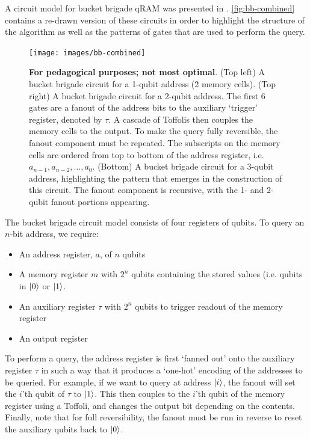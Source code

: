 \documentclass[a4paper,12pt]{article}
\begin{document}
A circuit model for bucket brigade qRAM was presented in \cite{Arunachalam2015}.
\autoref{fig:bb-combined} contains a re-drawn version of these circuits in order to highlight the structure of the algorithm as well as the patterns of gates that are used to perform the query.

\begin{figure}
 \centering
  \captionsetup{width=.89\linewidth}
 \texttt{[image: images/bb-combined]}
 \caption{\textbf{For pedagogical purposes; not most optimal}. 
 (Top left) A bucket brigade circuit for a 1-qubit address (2 memory cells). 
 (Top right) A bucket brigade circuit for a 2-qubit address. 
 The first 6 gates are a fanout of the address bits to the auxiliary `trigger' register, denoted by $\tau$. 
 A cascade of Toffolis then couples the memory cells to the output. 
 To make the query fully reversible, the fanout component must be repeated. 
 The subscripts on the memory cells are ordered from top to bottom of the address register, i.e. $a_{n-1}, a_{n-2}, \ldots, a_0$. 
 (Bottom) A bucket brigade circuit for a 3-qubit address, highlighting the pattern that emerges in the construction of this circuit. 
 The fanout component is recursive, with the 1- and 2-qubit fanout portions appearing.}
 \label{fig:bb-combined}
\end{figure}


The bucket brigade circuit model consists of four registers of qubits. 
To query an $n$-bit address, we require:
\begin{itemize}
 \item An address register, $a$, of $n$ qubits
 \item A memory register $m$ with $2^n$ qubits containing the stored values (i.e. qubits in $\ket{0}$ or $\ket{1}$.
 \item An auxiliary register $\tau$ with $2^n$ qubits to trigger readout of the memory register
 \item An output register
\end{itemize}

To perform a query, the address register is first `fanned out' onto the auxiliary register $\tau$ in such a way that it produces a `one-hot' encoding of the addresses to be queried. 
For example, if we want to query at address $\ket{i}$, the fanout will set the $i$'th qubit of $\tau$ to $\ket{1}$. 
This then couples to the $i$'th qubit of the memory register using a Toffoli, and changes the output bit depending on the contents. 
Finally, note that for full reversibility, the fanout must be run in reverse to reset the auxiliary qubits back to $\ket{0}$. 
\end{document}
